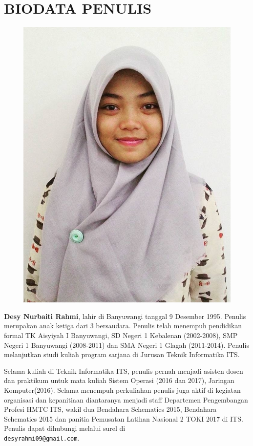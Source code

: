 \chapter{BIODATA PENULIS}
\begin{figure}
\includegraphics[height=0.3\textheight]{biodata/foto.jpg}
\end{figure}

\textbf{Desy Nurbaiti Rahmi}, lahir di Banyuwangi tanggal 9 Desember 1995. Penulis merupakan anak ketiga dari 3 bersaudara. Penulis telah menempuh pendidikan formal TK Aisyiyah I Banyuwangi, SD Negeri 1 Kebalenan (2002-2008), SMP Negeri 1 Banyuwangi (2008-2011) dan SMA Negeri 1 Glagah (2011-2014). Penulis melanjutkan studi kuliah program sarjana di Jurusan Teknik Informatika ITS. 

Selama kuliah di Teknik Informatika ITS, penulis  pernah menjadi asisten dosen dan praktikum untuk mata kuliah Sistem Operasi (2016 dan 2017), Jaringan Komputer(2016). Selama menempuh perkuliahan penulis juga aktif di kegiatan organisasi dan kepanitiaan diantaranya menjadi staff Departemen Pengembangan Profesi HMTC ITS, wakil dua Bendahara Schematics 2015, Bendahara Schematics 2015 dan panitia Pemusatan Latihan Nasional 2 TOKI 2017 di ITS. Penulis dapat dihubungi melalui surel di \\ \texttt{desyrahmi09@gmail.com}.

